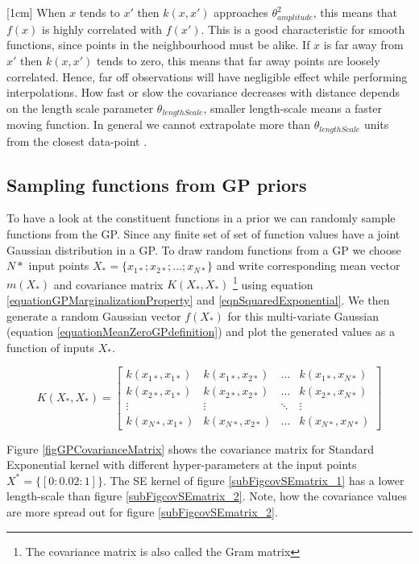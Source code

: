 [1cm]
When \(x\) tends to \(x'\) then \(k(x, x')\) approaches \(\theta_{amplitude}^{2}\), this means that \(f(x)\) is highly correlated with \(f(x')\). This is a good characteristic for smooth functions, since points in the neighbourhood must be alike. If \(x\) is far away from  \(x'\) then \(k(x, x')\) tends to zero, this means that far away points are loosely correlated. Hence, far off observations will have negligible effect while performing interpolations. How fast or slow the covariance decreases with distance depends on the length scale parameter \(\theta_{lengthScale}\), smaller length-scale means a faster moving function. In general we cannot extrapolate more than \(\theta_{lengthScale}\) units from the closest data-point \cite{duvenaud-thesis-2014}. 

\subsection{Sampling functions from GP priors}\label{subSecSamplingFunctionsGPPrior}
To have a look at the constituent functions in a prior we can randomly sample functions from the GP. Since any finite set of set of function values have a joint Gaussian distribution in a GP. To draw random functions from a GP we choose \(N*\) input points \(X_{*} = \{x_{1*}; x_{2*}; \ldots ; x_{N*}\}\) and write corresponding mean vector \(m(X_{*})\) and covariance matrix \(K(X_{*}, X_{*} )\) \footnote{The covariance matrix is also called the Gram matrix} using equation \ref{equationGPMarginalizationProperty} and \ref{eqnSquaredExponential}. We then generate a random Gaussian vector \(f(X_{*})\) for this multi-variate Gaussian (equation \ref{equationMeanZeroGPdefinition}) and plot the generated values as a function of inputs \(X_{*}\). 

\begin{equation}\label{eqnCovMatrixSquaredExponential}
K(X_{*}, X_{*} ) = \left [ \begin{matrix}
k(x_{1*}, x_{1*}) & k(x_{1*}, x_{2*}) & \ldots & k(x_{1*}, x_{N*})
\\ k(x_{2*}, x_{1*}) & k(x_{2*}, x_{2*}) & \ldots & k(x_{2*}, x_{N*})
\\ \vdots & \vdots & \ddots & \vdots
\\ k(x_{N*}, x_{1*}) & k(x_{N*}, x_{2*}) & \ldots & k(x_{N*}, x_{N*})
\end{matrix} \right ] 
\end{equation}

Figure \ref{figGPCovarianceMatrix} shows the covariance matrix for Standard Exponential kernel with different hyper-parameters at the input points \(X^{*} = \{[0:0.02:1]\}\). The SE kernel of figure \ref{subFigcovSEmatrix_1} has a lower length-scale than figure \ref{subFigcovSEmatrix_2}. Note, how the covariance values are more spread out for figure \ref{subFigcovSEmatrix_2}.


